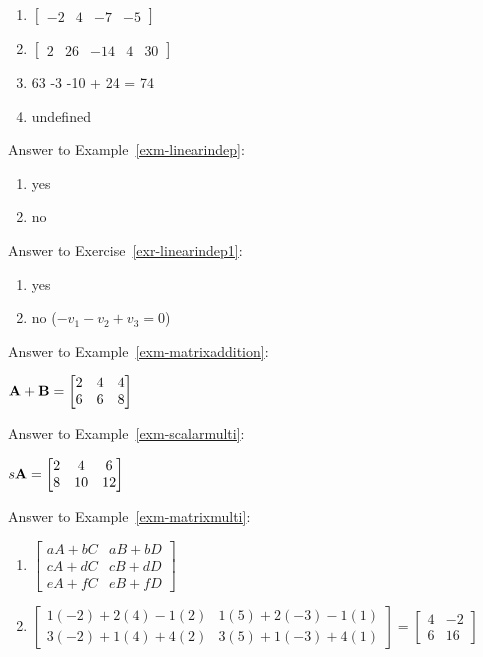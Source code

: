 \documentclass[
  letterpaper,
]{book}
\providecommand{\tightlist}{%
  \setlength{\itemsep}{0pt}\setlength{\parskip}{0pt}}\usepackage{longtable,booktabs,array}
\theoremstyle{definition}
\theoremstyle{definition}
\theoremstyle{plain}
\theoremstyle{definition}
\theoremstyle{plain}
\theoremstyle{plain}
\theoremstyle{remark}
\begin{document}
\begin{enumerate}
\def\labelenumi{\arabic{enumi}.}
\tightlist
\item
  \(\begin{bmatrix} -2 &4&-7&-5 \end{bmatrix}\)
\item
  \(\begin{bmatrix} 2 &26&-14&4&30 \end{bmatrix}\)
\item
  63 -3 -10 + 24 = 74
\item
  undefined
\end{enumerate}

Answer to Example~\ref{exm-linearindep}:

\begin{enumerate}
\def\labelenumi{\arabic{enumi}.}
\tightlist
\item
  yes
\item
  no
\end{enumerate}

Answer to Exercise~\ref{exr-linearindep1}:

\begin{enumerate}
\def\labelenumi{\arabic{enumi}.}
\tightlist
\item
  yes
\item
  no (\(-v_1 -v_2 + v_3 = 0\))
\end{enumerate}

Answer to Example~\ref{exm-matrixaddition}:

\({\bf A+B}=\begin{bmatrix} 2 & 4 & 4 \\ 6 & 6 & 8 \end{bmatrix}\)

Answer to Example~\ref{exm-scalarmulti}:

\(s {\bf A} = \begin{bmatrix} 2 & 4 & 6 \\ 8 & 10 & 12 \end{bmatrix}\)

Answer to Example~\ref{exm-matrixmulti}:

\begin{enumerate}
\def\labelenumi{\arabic{enumi}.}
\item
  \(\begin{bmatrix} aA+bC&aB+bD\\cA+dC&cB+dD\\eA+fC&eB+fD \end{bmatrix}\)
\item
  \(\begin{bmatrix} 1(-2)+2(4)-1(2)&1(5)+2(-3)-1(1)\\  3(-2)+1(4)+4(2)&3(5)+1(-3)+4(1)\end{bmatrix} =  \begin{bmatrix} 4&-2\\6&16\end{bmatrix}\)
\end{enumerate}
\end{document}
